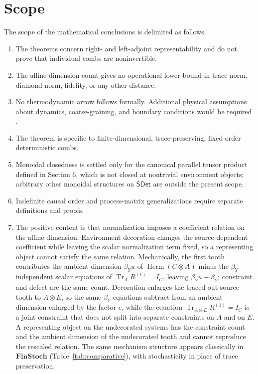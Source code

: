 \documentclass[11pt,a4paper]{article}
\theoremstyle{definition}
\theoremstyle{plain}
\theoremstyle{remark}
\DeclareMathOperator{\Tr}{Tr}
\DeclareMathOperator{\Herm}{Herm}
\newcommand{\SDet}{\mathsf{SDet}}
\begin{document}
\section{Scope}

The scope of the mathematical conclusions is delimited as follows.

\begin{enumerate}
\item The theorems concern right- and left-adjoint representability and do not prove that individual combs are noninvertible.
\item The affine dimension count gives no operational lower bound in trace norm, diamond norm, fidelity, or any other distance.
\item No thermodynamic arrow follows formally. Additional physical assumptions about dynamics, coarse-graining, and boundary conditions would be required \cite{price1996,wallace2023}.
\item The theorem is specific to finite-dimensional, trace-preserving, fixed-order deterministic combs.
\item Monoidal closedness is settled only for the canonical parallel tensor product defined in Section 6, which is not closed at nontrivial environment objects; arbitrary other monoidal structures on $\SDet$ are outside the present scope.
\item Indefinite causal order and process-matrix generalizations require separate definitions and proofs.
\item The positive content is that normalization imposes a coefficient relation on the affine dimension. Environment decoration changes the source-dependent coefficient while leaving the scalar normalization term fixed, so a representing object cannot satisfy the same relation. Mechanically, the first tooth contributes the ambient dimension $\beta_Yu$ of $\Herm(C\otimes A)$ minus the $\beta_Y$ independent scalar equations of $\Tr_A R^{(1)}=I_C$, leaving $\beta_Yu-\beta_Y$; constraint and defect are the same count. Decoration enlarges the traced-out source tooth to $A\otimes E$, so the same $\beta_Y$ equations subtract from an ambient dimension enlarged by the factor $e$, while the equation $\Tr_{A\otimes E}R^{(1)}=I_C$ is a joint constraint that does not split into separate constraints on $A$ and on $E$. A representing object on the undecorated systems has the constraint count and the ambient dimension of the undecorated tooth and cannot reproduce the rescaled relation. The same mechanism structure appears classically in $\mathbf{FinStoch}$ (Table~\ref{tab:comparative}), with stochasticity in place of trace preservation.
\end{enumerate}
\end{document}

